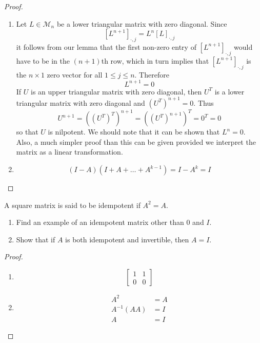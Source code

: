 \begin{exercise}
\begin{proof}
\begin{enumerate}
            \item Let \( L \in \mathcal{M}_n \) be a lower triangular matrix with zero diagonal. Since
            \[
            \left[ L^{n+1} \right]_{\cdot, j} = L^{n}\left[ L \right]_{\cdot, j}
            \]
            it follows from our lemma that the first non-zero entry of \( \left[ L^{n+1} \right]_{\cdot, j} \) would have to be in the \( (n+1) \)th row, which in turn implies that \( \left[ L^{n+1} \right]_{\cdot, j} \) is the \( n \times 1 \) zero vector for all \( 1 \leq j \leq n \). Therefore
            \[
            L^{n+1} = 0
            \]
            If \( U \) is an upper triangular matrix with zero diagonal, then \( U^T \) is a lower triangular matrix with zero diagonal and \( (U^T)^{n+1} = 0 \). Thus
            \[
            U^{n+1} = ((U^T)^T)^{n+1} = ((U^T)^{n+1})^T = 0^T = 0
            \]
            so that \( U \) is nilpotent. We should note that it can be shown that \( L^n = 0 \). Also, a much simpler proof than this can be given provided we interpret the matrix as a linear transformation.
            
            \item 
            \[
            (I-A)(I+A+\ldots+A^{k-1}) = I - A^k = I
            \]
        \end{enumerate}
    \end{proof}
\end{exercise}

\begin{exercise} \label{E.1.28}
    A square matrix is said to be idempotent if \( A^2 = A \). 
    \begin{enumerate}
        \item Find an example of an idempotent matrix other than \( 0 \) and \( I \).
        
        \item Show that if \( A \) is both idempotent and invertible, then \( A = I \).
    \end{enumerate}
    
    \begin{proof}
        \begin{enumerate}
            \item 
            \[
            \begin{bmatrix}
            1 & 1 \\
            0 & 0
            \end{bmatrix}
            \]
            
            \item
            \begin{align*}
                A^2 &= A \\
                A^{-1}(AA) &= I \\
                A &= I
            \end{align*}
        \end{enumerate}
    \end{proof}
\end{exercise}

